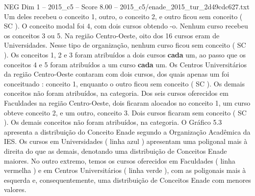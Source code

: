 \begin{textsample}{NEG Dim 1 – 2015\_c5 – Score 8.00 – 2015\_c5/enade\_2015\_tur\_2d49cdc627.txt}
Um deles recebeu o conceito 1, outro, o conceito 2, e outro ficou sem conceito ( SC ).
O conceito modal foi 4, com dois cursos obtendo -o.
Nenhum curso recebeu os conceitos 3 ou 5.
Na região Centro-Oeste, oito dos 16 cursos eram de Universidades.
Nesse tipo de organização, nenhum curso ficou sem conceito ( SC ).
Os conceitos 1, 2 e 3 foram atribuídos a dois cursos \textbf{cada} um, ao passo que os conceitos 4 e 5 foram atribuídos a um curso \textbf{cada} um.
Os Centros Universitários da região Centro-Oeste contaram com dois cursos, dos quais apenas um foi conceituado : conceito 1, enquanto o outro ficou sem conceito ( SC ).
Os demais conceitos não foram atribuídos, na categoria.
Dos seis cursos oferecidos em Faculdades na região Centro-Oeste, dois ficaram alocados no conceito 1, um curso obteve conceito 2, e um outro, conceito 3.
Dois cursos ficaram sem conceito ( SC ).
Os demais conceitos não foram atribuídos, na categoria.
O Gráfico 5.3 apresenta a distribuição do Conceito Enade segundo a Organização Acadêmica da IES.
Os cursos em Universidades ( linha azul ) apresentam uma poligonal mais à direita do que as demais, denotando uma distribuição de Conceitos Enade maiores.
No outro extremo, temos os cursos oferecidos em Faculdades ( linha vermelha ) e em Centros Universitários ( linha verde ), com as poligonais mais à esquerda e, consequentemente, uma distribuição de Conceitos Enade com menores valores.

\end{textsample}
